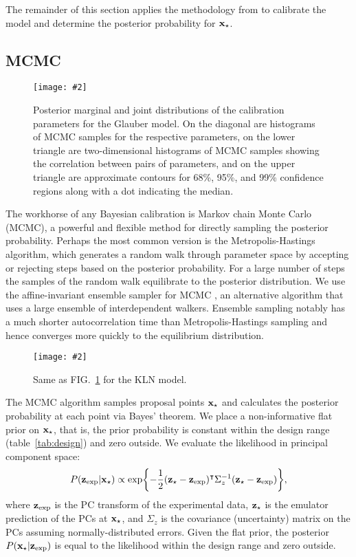 \documentclass[aps,prc,reprint,superscriptaddress,amsmath]{revtex4-1}
\newcommand{\widefig}[3][t]{
  \begin{figure*}[#1]
    \texttt{[image: \#2]}
    \caption{\label{fig:#2}#3}
  \end{figure*}
}
\newcommand{\tran}{^\intercal}
\begin{document}
The remainder of this section applies the methodology from \cite{OHagan:2006ba,Higdon:2008cmc,Higdon:2014tva} to calibrate the model and determine the posterior probability for $\mathbf x_\star$.

\subsection{MCMC}

\widefig{cal_post_glb}{
  Posterior marginal and joint distributions of the calibration parameters for the Glauber model.
  On the diagonal are histograms of MCMC samples for the respective parameters,
  on the lower triangle are two-dimensional histograms of MCMC samples showing the correlation between pairs of parameters,
  and on the upper triangle are approximate contours for 68\%, 95\%, and 99\% confidence regions along with a dot indicating the median.
}

The workhorse of any Bayesian calibration is Markov chain Monte Carlo (MCMC), a powerful and flexible method for directly sampling the posterior probability.
Perhaps the most common version is the Metropolis-Hastings algorithm, which generates a random walk through parameter space by accepting or rejecting steps based on the posterior probability.
For a large number of steps the samples of the random walk equilibrate to the posterior distribution.
We use the affine-invariant ensemble sampler for MCMC \cite{Goodman:2010en,FM:2013mc}, an alternative algorithm that uses a large ensemble of interdependent walkers.
Ensemble sampling notably has a much shorter autocorrelation time than Metropolis-Hastings sampling and hence converges more quickly to the equilibrium distribution.

\widefig{cal_post_kln}{
  Same as FIG.~\ref{fig:cal_post_glb} for the KLN model.
}

The MCMC algorithm samples proposal points $\mathbf x_\star$ and calculates the posterior probability at each point via Bayes' theorem.
We place a non-informative flat prior on $\mathbf x_\star$, that is, the prior probability is constant within the design range (table~\ref{tab:design}) and zero outside.
We evaluate the likelihood in principal component space:
\begin{equation}
  P(\zexp|\xs) \propto \exp\biggl\{ -\frac{1}{2} (\zs - \zexp)\tran \Sigma_z^{-1} (\zs - \zexp) \biggr\},
  \label{eq:likelihood}
\end{equation}
where $\mathbf z_\text{exp}$ is the PC transform of the experimental data, $\mathbf z_\star$ is the emulator prediction of the PCs at $\mathbf x_\star$, and $\Sigma_z$ is the covariance (uncertainty) matrix on the PCs assuming normally-distributed errors.
Given the flat prior, the posterior $P(\mathbf x_\star|\mathbf z_\text{exp})$ is equal to the likelihood within the design range and zero outside.
\end{document}
